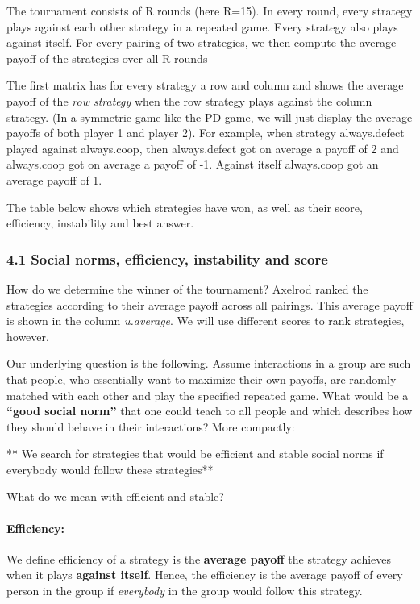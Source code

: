 \documentclass[]{article}
\begin{document}
The tournament consists of R rounds (here R=15). In every round, every
strategy plays against each other strategy in a repeated game. Every
strategy also plays against itself. For every pairing of two strategies,
we then compute the average payoff of the strategies over all R rounds

The first matrix has for every strategy a row and column and shows the
average payoff of the \emph{row strategy} when the row strategy plays
against the column strategy. (In a symmetric game like the PD game, we
will just display the average payoffs of both player 1 and player 2).
For example, when strategy always.defect played against always.coop,
then always.defect got on average a payoff of 2 and always.coop got on
average a payoff of -1. Against itself always.coop got an average payoff
of 1.

The table below shows which strategies have won, as well as their score,
efficiency, instability and best answer.

\subsubsection{4.1 Social norms, efficiency, instability and score}

How do we determine the winner of the tournament? Axelrod ranked the
strategies according to their average payoff across all pairings. This
average payoff is shown in the column \emph{u.average}. We will use
different scores to rank strategies, however.

Our underlying question is the following. Assume interactions in a group
are such that people, who essentially want to maximize their own
payoffs, are randomly matched with each other and play the specified
repeated game. What would be a \textbf{``good social norm''} that one
could teach to all people and which describes how they should behave in
their interactions? More compactly:

** We search for strategies that would be efficient and stable social
norms if everybody would follow these strategies**

What do we mean with efficient and stable?

\paragraph{\textbf{Efficiency:}}

We define efficiency of a strategy is the \textbf{average payoff} the
strategy achieves when it plays \textbf{against itself}. Hence, the
efficiency is the average payoff of every person in the group if
\emph{everybody} in the group would follow this strategy.
\end{document}
